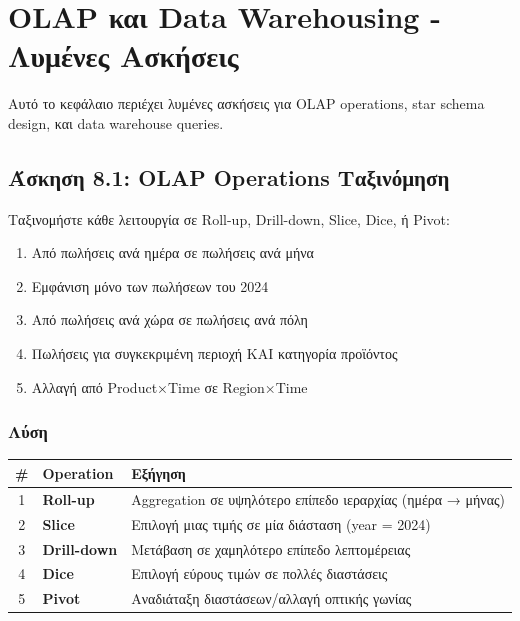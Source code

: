 
\chapter{OLAP και Data Warehousing - Λυμένες Ασκήσεις}
\label{ch:olap-dw-exercises}

Αυτό το κεφάλαιο περιέχει λυμένες ασκήσεις για OLAP operations, star schema design,
και data warehouse queries.

\section{Άσκηση 8.1: OLAP Operations Ταξινόμηση}

\begin{formulabox}[Εκφώνηση]
Ταξινομήστε κάθε λειτουργία σε Roll-up, Drill-down, Slice, Dice, ή Pivot:

\begin{enumerate}
    \item Από πωλήσεις ανά ημέρα σε πωλήσεις ανά μήνα
    \item Εμφάνιση μόνο των πωλήσεων του 2024
    \item Από πωλήσεις ανά χώρα σε πωλήσεις ανά πόλη
    \item Πωλήσεις για συγκεκριμένη περιοχή ΚΑΙ κατηγορία προϊόντος
    \item Αλλαγή από Product×Time σε Region×Time
\end{enumerate}
\end{formulabox}

\subsection*{Λύση}

\begin{center}
\begin{tabular}{clp{6cm}}
\toprule
\textbf{\#} & \textbf{Operation} & \textbf{Εξήγηση} \\
\midrule
1 & \textbf{Roll-up} & Aggregation σε υψηλότερο επίπεδο ιεραρχίας (ημέρα → μήνας) \\
2 & \textbf{Slice} & Επιλογή μιας τιμής σε μία διάσταση (year = 2024) \\
3 & \textbf{Drill-down} & Μετάβαση σε χαμηλότερο επίπεδο λεπτομέρειας \\
4 & \textbf{Dice} & Επιλογή εύρους τιμών σε πολλές διαστάσεις \\
5 & \textbf{Pivot} & Αναδιάταξη διαστάσεων/αλλαγή οπτικής γωνίας \\
\bottomrule
\end{tabular}
\end{center}

